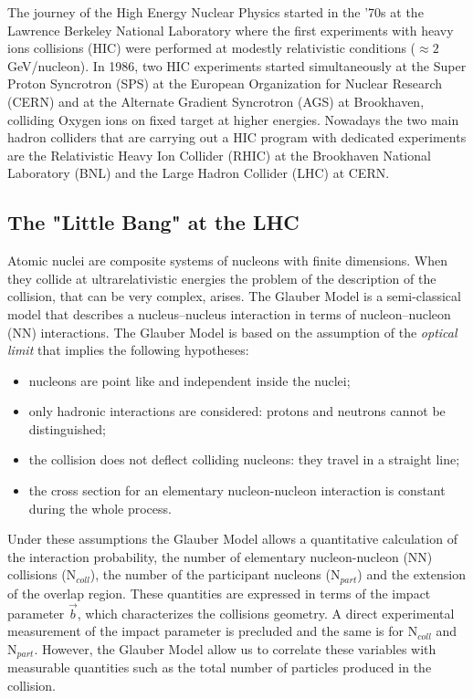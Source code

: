 The journey of the High Energy Nuclear Physics started in the '70s at the Lawrence Berkeley National
Laboratory where the first experiments with heavy ions collisions (HIC) were performed at modestly
relativistic conditions ($\approx 2\ $ GeV/nucleon).
In 1986, two HIC experiments started simultaneously at the Super Proton Syncrotron (SPS) at
the European Organization for Nuclear Research (CERN) and at the Alternate Gradient Syncrotron (AGS)
at Brookhaven, colliding Oxygen ions on fixed target at higher energies.
Nowadays the two main hadron colliders that are carrying out a HIC program with dedicated experiments are the
Relativistic Heavy Ion Collider (RHIC) at the Brookhaven National Laboratory (BNL) and the Large Hadron
Collider (LHC) at CERN.

%
\subsection{The "Little Bang" at the LHC}
\label{sec:1.3.1}

Atomic nuclei are composite systems of nucleons with finite dimensions. When they collide at 
ultrarelativistic energies the problem of the description of the collision, that can be very
complex, arises.
The Glauber Model \cite{glauber} is a semi-classical model that describes a nucleus–nucleus 
interaction in terms of nucleon–nucleon (NN) interactions.
The Glauber Model is based on the assumption of the \textit{optical limit} that implies the following hypotheses:
\begin{itemize}
    \item nucleons are point like and independent inside the nuclei;
    \item only hadronic interactions are considered: protons and neutrons cannot be distinguished;
    \item the collision does not deflect colliding nucleons: they travel in a straight line;
    \item the cross section for an elementary nucleon-nucleon interaction is constant during the whole 
    process.
\end{itemize}
Under these assumptions the Glauber Model allows a quantitative calculation of the interaction
probability, the number of elementary nucleon-nucleon (NN) collisions ($\mathrm{N}_{coll}$), the number
of the participant nucleons ($\mathrm{N}_{part}$) and the extension of the overlap region.
These quantities are expressed in terms of the impact parameter $\vec{b}$, which characterizes
the collisions geometry.
A direct experimental measurement of the impact parameter is precluded and the same is for
$\mathrm{N}_{coll}$ and $\mathrm{N}_{part}$.
However, the Glauber Model allow us to correlate these variables with measurable quantities
such as the total number of particles produced in the collision.

